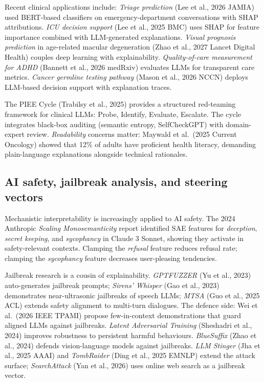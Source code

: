 Recent clinical applications include: \emph{Triage prediction} (Lee et al., 2026 JAMIA) used BERT-based classifiers on emergency-department conversations with SHAP attributions. \emph{ICU decision support} (Lee et al., 2025 BMC) uses SHAP for feature importance combined with LLM-generated explanations. \emph{Visual prognosis prediction} in age-related macular degeneration (Zhao et al., 2027 Lancet Digital Health) couples deep learning with explainability. \emph{Quality-of-care measurement for ADHD} (Bannett et al., 2026 medRxiv) evaluates LLMs for transparent care metrics. \emph{Cancer germline testing pathway} (Mason et al., 2026 NCCN) deploys LLM-based decision support with explanation traces.

The PIEE Cycle (Trabilsy et al., 2025) provides a structured red-teaming framework for clinical LLMs: Probe, Identify, Evaluate, Escalate. The cycle integrates black-box auditing (semantic entropy, SelfCheckGPT) with domain-expert review. \emph{Readability} concerns matter: Maywald et al.~(2025 Current Oncology) showed that 12\% of adults have proficient health literacy, demanding plain-language explanations alongside technical rationales.

\subsection{AI safety, jailbreak analysis, and steering vectors}\label{ai-safety-jailbreak-analysis-and-steering-vectors}

Mechanistic interpretability is increasingly applied to AI safety. The 2024 Anthropic \emph{Scaling Monosemanticity} report identified SAE features for \emph{deception}, \emph{secret keeping}, and \emph{sycophancy} in Claude 3 Sonnet, showing they activate in safety-relevant contexts. Clamping the \emph{refusal} feature reduces refusal rate; clamping the \emph{sycophancy} feature decreases user-pleasing tendencies.

Jailbreak research is a cousin of explainability. \emph{GPTFUZZER} (Yu et al., 2023) auto-generates jailbreak prompts; \emph{Sirens' Whisper} (Gao et al., 2023) demonstrates near-ultrasonic jailbreaks of speech LLMs; \emph{MTSA} (Guo et al., 2025 ACL) extends safety alignment to multi-turn dialogues. The defence side: Wei et al.~(2026 IEEE TPAMI) propose few-in-context demonstrations that guard aligned LLMs against jailbreaks. \emph{Latent Adversarial Training} (Sheshadri et al., 2024) improves robustness to persistent harmful behaviours. \emph{BlueSuffix} (Zhao et al., 2024) defends vision-language models against jailbreaks. \emph{LLM Stinger} (Jha et al., 2025 AAAI) and \emph{TombRaider} (Ding et al., 2025 EMNLP) extend the attack surface; \emph{SearchAttack} (Yan et al., 2026) uses online web search as a jailbreak vector.

